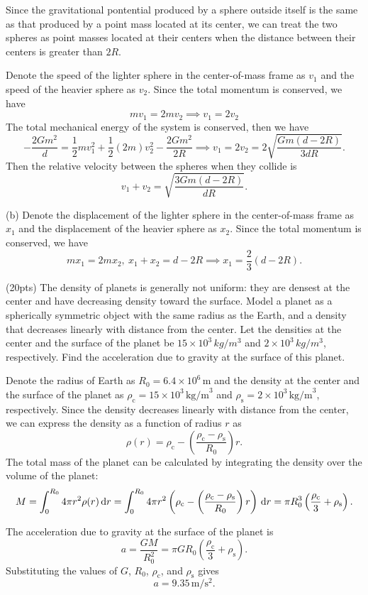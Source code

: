 \documentclass{article}
\begin{document}
\begin{solution}
  Since the gravitational pontential produced by a sphere outside itself is the same as that produced by a point mass located at its center, we can treat the two spheres as point masses located at their centers when the distance between their centers is greater than $2R$.\par
  Denote the speed of the lighter sphere in the center-of-mass frame as $v_1$ and the speed of the heavier sphere as $v_2$. Since the total momentum is conserved, we have
  \[ mv_1= 2mv_2\implies v_1= 2v_2 \]
  The total mechanical energy of the system is conserved, then we have
  \[ -\frac{2Gm^2}{d} = \frac{1}{2}mv_1^2 + \frac{1}{2}(2m)v_2^2-\frac{2Gm^2}{2R}\implies v_1=2v_2=2\sqrt{\frac{Gm(d-2R)}{3dR}}. \]
  Then the relative velocity between the spheres when they collide is
  \[ v_1+v_2=\sqrt{\frac{3Gm(d-2R)}{dR}}. \]\par
  (b) Denote the displacement of the lighter sphere in the center-of-mass frame as $x_1$ and the displacement of the heavier sphere as $x_2$. Since the total momentum is conserved, we have
  \[ m x_1=2mx_2,\ x_1+x_2=d-2R\implies x_1=\frac{2}{3}(d-2R). \]
\end{solution}



\begin{problem}
(20pts) The density of planets is generally not uniform: they are densest at the center
and have decreasing density toward the surface. Model a planet as a spherically
symmetric object with the same radius as the Earth, and a density that decreases
linearly with distance from the center. Let the densities at the center and the surface
of the planet be $15\times10^3\,kg/m^3$ and $2\times10^3\,kg/m^3$, respectively. Find the acceleration
due to gravity at the surface of this planet.
\end{problem}

\begin{solution}
  Denote the radius of Earth as \( R_0=6.4 \times 10^6 \, \text{m} \) and the density at the center and the surface of the planet as \( \rho_\mathrm{c}=15 \times 10^3 \, \text{kg/m}^3 \) and \( \rho_\mathrm{s}=2 \times 10^3 \, \text{kg/m}^3 \), respectively. Since the density decreases linearly with distance from the center, we can express the density as a function of radius \( r \) as
  \[ \rho(r) = \rho_\mathrm{c} - \left( \frac{\rho_\mathrm{c} - \rho_\mathrm{s}}{R_0} \right) r. \]
  The total mass of the planet can be calculated by integrating the density over the volume of the planet:
  \[ M = \int_0^{R_0} 4\pi r^2 \rho(r) \,\mathrm{d} r = \int_0^{R_0} 4\pi r^2 \left( \rho_\mathrm{c} - \left( \frac{\rho_\mathrm{c} - \rho_\mathrm{s}}{R_0} \right) r \right) \,\mathrm{d} r=\pi R_0^3\left( \frac{\rho_\mathrm{c}}{3}+\rho_\mathrm{s} \right). \]\par
  The acceleration due to gravity at the surface of the planet is
  \[ a = \frac{GM}{R_0^2}=\pi G R_0\left( \frac{\rho_\mathrm{c}}{3}+\rho_\mathrm{s} \right). \]
  Substituting the values of \( G \), \( R_0 \), \( \rho_\mathrm{c} \), and \( \rho_\mathrm{s} \) gives
  \[ a=9.35\,\mathrm{m/s^2}. \]
\end{solution}
\end{document}
